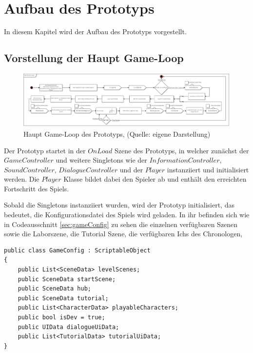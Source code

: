 \section{Aufbau des Prototyps}
In diesem Kapitel wird der Aufbau des Prototyps vorgestellt. 

\subsection{Vorstellung der Haupt Game-Loop}
\begin{figure}[ht]
\centering
\includegraphics[width=1\linewidth]{content/pictures/Game-Loop_Prototype.jpg}
\caption{Haupt Game-Loop des Prototyps, (Quelle: eigene Darstellung)}
\label{fig:main_game_loop}
\end{figure}

Der Prototyp startet in der $OnLoad$ Szene des Prototyps, in welcher zunächst der $GameController$ und weitere Singletons wie der $InformationController$, $SoundController$, $DialogueController$ und der $Player$ instanziiert und initialisiert werden. Die $Player$ Klasse bildet dabei den Spieler ab und enthält den erreichten Fortschritt des Spiels.

Sobald die Singletons instanziiert wurden, wird der Prototyp initialisiert, das bedeutet, die Konfigurationsdatei des Spiels wird geladen. In ihr befinden sich wie in Codeausschnitt \ref{sec:gameConfig} zu sehen die einzelnen verfügbaren Szenen sowie die Laborszene, die Tutorial Szene, die verfügbaren Ichs des Chronologen, 

\begin{lstlisting}[caption={GameConfig des Prototyps}, label={sec:gameConfig}]
public class GameConfig : ScriptableObject
{
    public List<SceneData> levelScenes;
    public SceneData startScene;
    public SceneData hub;
    public SceneData tutorial;
    public List<CharacterData> playableCharacters;
    public bool isDev = true;
    public UIData dialogueUiData;
    public List<TutorialData> tutorialUiData;
}
\end{lstlisting}



